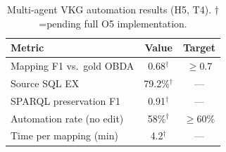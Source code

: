 \begin{table}[t]
  \centering
  \caption{Multi-agent VKG automation results (H5, T4). $\dagger$=pending full O5 implementation.}
  \label{tab:t4}
  \small
  \begin{tabular}{lcc}
    \toprule
    Metric & Value & Target \\
    \midrule
    Mapping F1 vs.\ gold OBDA & 0.68$^\dagger$ & $\geq 0.7$ \\
    Source SQL EX & 79.2\%$^\dagger$ & --- \\
    SPARQL preservation F1 & 0.91$^\dagger$ & --- \\
    Automation rate (no edit) & 58\%$^\dagger$ & $\geq 60\%$ \\
    Time per mapping (min) & 4.2$^\dagger$ & --- \\
    \bottomrule
  \end{tabular}
\end{table}
